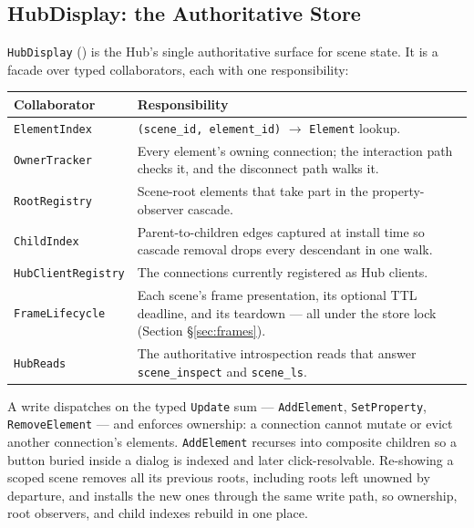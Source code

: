 \documentclass[a4paper,10pt]{article}
\newcommand{\modpath}[1]{\path{src/punt_lux/#1}}
\newcommand{\tool}[1]{\texttt{#1}}
\newcommand{\field}[1]{\texttt{#1}}
\begin{document}
\subsection{HubDisplay: the Authoritative Store}

\texttt{HubDisplay} (\modpath{hub/hub\_display.py}) is the Hub's
single authoritative surface for scene state.  It is a facade over typed
collaborators, each with one responsibility:

\begin{center}
\begin{tabular}{lp{8.5cm}}
\toprule
\textbf{Collaborator} & \textbf{Responsibility} \\
\midrule
\texttt{ElementIndex}       & \field{(scene\_id, element\_id)} $\to$
  \texttt{Element} lookup. \\
\texttt{OwnerTracker}       & Every element's owning connection; the
  interaction path checks it, and the disconnect path walks it. \\
\texttt{RootRegistry}       & Scene-root elements that take part in the
  property-observer cascade. \\
\texttt{ChildIndex}         & Parent-to-children edges captured at install
  time so cascade removal drops every descendant in one walk. \\
\texttt{HubClientRegistry}  & The connections currently registered as Hub
  clients. \\
\texttt{FrameLifecycle}     & Each scene's frame presentation, its optional
  TTL deadline, and its teardown --- all under the store lock (Section
  \S\ref{sec:frames}). \\
\texttt{HubReads}           & The authoritative introspection reads that
  answer \tool{scene\_inspect} and \tool{scene\_ls}. \\
\bottomrule
\end{tabular}
\end{center}

A write dispatches on the typed \texttt{Update} sum ---
\texttt{AddElement}, \texttt{SetProperty}, \texttt{RemoveElement} --- and
enforces ownership: a connection cannot mutate or evict another
connection's elements.  \texttt{AddElement} recurses into composite
children so a button buried inside a dialog is indexed and later
click-resolvable. Re-showing a scoped scene removes all its previous roots,
including roots left unowned by departure, and installs the new ones through
the same write path, so ownership,
root observers, and child indexes rebuild in one place.
\end{document}
